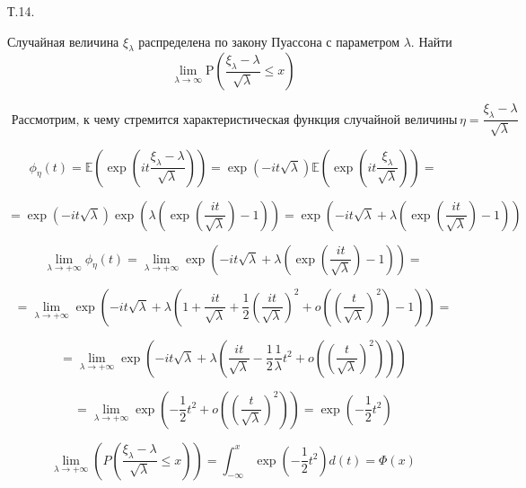 \documentclass[a4paper,12pt]{article} %
\begin{document}
\begin{example} Т.14. 

Случайная величина $\xi_{\lambda}$ распределена по закону Пуассона с параметром $\lambda .$ Найти
$$
\lim _{\lambda \rightarrow \infty} \mathrm{P}\left(\frac{\xi_{\lambda}-\lambda}{\sqrt{\lambda}} \leqslant x\right)
$$



$$
\text { Рассмотрим, к чему стремится характеристическая функция случайной величины } \eta=\frac{\xi_{\lambda}-\lambda}{\sqrt{\lambda}}
$$


$$
\phi_{\eta}(t)=\mathbb{E}\left(\exp \left(i t \frac{\xi_{\lambda}-\lambda}{\sqrt{\lambda}}\right)\right)=\exp (-i t \sqrt{\lambda}) \mathbb{E}\left(\exp \left(i t \frac{\xi_{\lambda}}{\sqrt{\lambda}}\right)\right)=
$$


$$
=\exp (-i t \sqrt{\lambda}) \exp \left(\lambda\left(\exp \left(\frac{i t}{\sqrt{\lambda}}\right)-1\right)\right)=\exp \left(-i t \sqrt{\lambda}+\lambda\left(\exp \left(\frac{i t}{\sqrt{\lambda}}\right)-1\right)\right)
$$


$$
\lim _{\lambda \rightarrow+\infty}\phi_{\eta}(t)
=
\lim _{\lambda \rightarrow+\infty}
\exp \left(-i t \sqrt{\lambda}+\lambda\left(\exp \left(\frac{i t}{\sqrt{\lambda}}\right)-1\right)\right)=
$$


$$
=\lim _{\lambda \rightarrow+\infty}\exp \left(-i t \sqrt{\lambda}+\lambda\left(1+\frac{i t}{\sqrt{\lambda}}+\frac{1}{2}\left(\frac{i t}{\sqrt{\lambda}}\right)^{2}+o\left(\left(\frac{t}{\sqrt{\lambda}}\right)^{2}\right)-1\right)\right)=
$$


$$
=\lim _{\lambda \rightarrow+\infty}\exp \left(-i t \sqrt{\lambda}+\lambda\left(\frac{i t}{\sqrt{\lambda}}-\frac{1}{2} \frac{1}{\lambda} t^{2}+o\left(\left(\frac{t}{\sqrt{\lambda}}\right)^{2}\right)\right)\right)
$$



$$
=\lim _{\lambda \rightarrow+\infty}
\exp \left(-\frac{1}{2} t^{2}+o\left(\left(\frac{t}{\sqrt{\lambda}}\right)^{2}\right)\right)
=
\exp \left(-\frac{1}{2} t^{2}\right)
$$


$$
\lim _{\lambda \rightarrow+\infty}\left(P\left(\frac{\xi_{\lambda}-\lambda}{\sqrt{\lambda}} \leq x\right)\right)=\int_{-\infty}^{x} \exp \left(-\frac{1}{2} t^{2}\right) d(t)=\Phi(x)
$$








\end{example}
\end{document}
